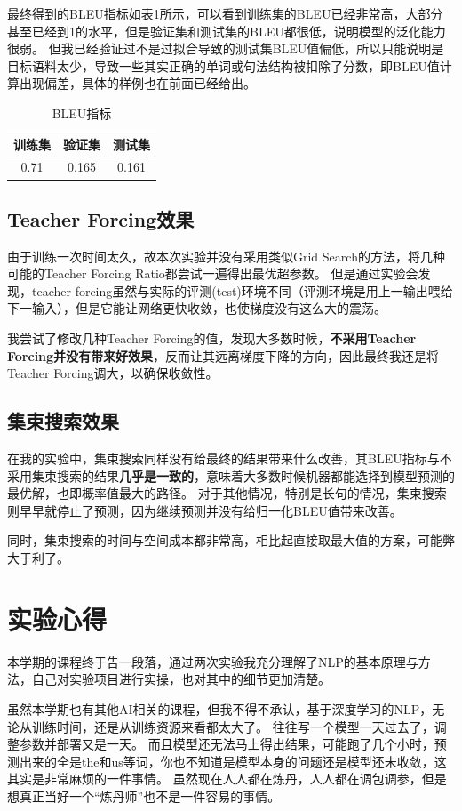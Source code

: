 \documentclass[logo,reportComp]{thesis}
\begin{document}
最终得到的BLEU指标如表\ref{tab:bleu}所示，可以看到训练集的BLEU已经非常高，大部分甚至已经到1的水平，但是验证集和测试集的BLEU都很低，说明模型的泛化能力很弱。
但我已经验证过不是过拟合导致的测试集BLEU值偏低，所以只能说明是目标语料太少，导致一些其实正确的单词或句法结构被扣除了分数，即BLEU值计算出现偏差，具体的样例也在前面已经给出。

\begin{table}[H]
\centering
\caption{BLEU指标}
\label{tab:bleu}
\begin{tabular}{|c|c|c|}\hline
    训练集 & 验证集 & 测试集\\\hline
    0.71 & 0.165 & 0.161\\\hline
\end{tabular}
\end{table}

\subsection{Teacher Forcing效果}
由于训练一次时间太久，故本次实验并没有采用类似Grid Search的方法，将几种可能的Teacher Forcing Ratio都尝试一遍得出最优超参数。
但是通过实验会发现，teacher forcing虽然与实际的评测(test)环境不同（评测环境是用上一输出喂给下一输入），但是它能让网络更快收敛，也使梯度没有这么大的震荡。

我尝试了修改几种Teacher Forcing的值，发现大多数时候，\textbf{不采用Teacher Forcing并没有带来好效果}，反而让其远离梯度下降的方向，因此最终我还是将Teacher Forcing调大，以确保收敛性。

\subsection{集束搜索效果}
在我的实验中，集束搜索同样没有给最终的结果带来什么改善，其BLEU指标与不采用集束搜索的结果\textbf{几乎是一致的}，意味着大多数时候机器都能选择到模型预测的最优解，也即概率值最大的路径。
对于其他情况，特别是长句的情况，集束搜索则早早就停止了预测，因为继续预测并没有给归一化BLEU值带来改善。

同时，集束搜索的时间与空间成本都非常高，相比起直接取最大值的方案，可能弊大于利了。

\section{实验心得}
本学期的课程终于告一段落，通过两次实验我充分理解了NLP的基本原理与方法，自己对实验项目进行实操，也对其中的细节更加清楚。

虽然本学期也有其他AI相关的课程，但我不得不承认，基于深度学习的NLP，无论从训练时间，还是从训练资源来看都太大了。
往往写一个模型一天过去了，调整参数并部署又是一天。
而且模型还无法马上得出结果，可能跑了几个小时，预测出来的全是the和us等词，你也不知道是模型本身的问题还是模型还未收敛，这其实是非常麻烦的一件事情。
虽然现在人人都在炼丹，人人都在调包调参，但是想真正当好一个``炼丹师''也不是一件容易的事情。
\end{document}
